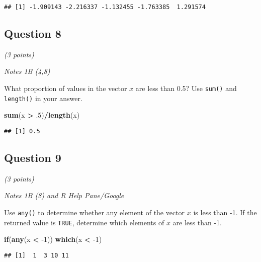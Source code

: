 \documentclass[
]{article}
\newenvironment{Shaded}{\begin{snugshade}}{\end{snugshade}}
\newcommand{\ControlFlowTok}[1]{\textcolor[rgb]{0.13,0.29,0.53}{\textbf{#1}}}
\newcommand{\DecValTok}[1]{\textcolor[rgb]{0.00,0.00,0.81}{#1}}
\newcommand{\FloatTok}[1]{\textcolor[rgb]{0.00,0.00,0.81}{#1}}
\newcommand{\KeywordTok}[1]{\textcolor[rgb]{0.13,0.29,0.53}{\textbf{#1}}}
\newcommand{\NormalTok}[1]{#1}
\newcommand{\OperatorTok}[1]{\textcolor[rgb]{0.81,0.36,0.00}{\textbf{#1}}}
\newcommand{\StringTok}[1]{\textcolor[rgb]{0.31,0.60,0.02}{#1}}
\begin{document}
\begin{verbatim}
## [1] -1.909143 -2.216337 -1.132455 -1.763385  1.291574
\end{verbatim}

\hypertarget{question-8}{%
\subsection{Question 8}\label{question-8}}

\emph{(3 points)}

\emph{Notes 1B (4,8)}

What proportion of values in the vector \(x\) are less than 0.5? Use
\texttt{sum()} and \texttt{length()} in your answer.

\begin{Shaded}
\begin{Highlighting}[]
\KeywordTok{sum}\NormalTok{(x }\OperatorTok{>}\StringTok{ }\FloatTok{.5}\NormalTok{)}\OperatorTok{/}\KeywordTok{length}\NormalTok{(x)}
\end{Highlighting}
\end{Shaded}

\begin{verbatim}
## [1] 0.5
\end{verbatim}

\hypertarget{question-9}{%
\subsection{Question 9}\label{question-9}}

\emph{(3 points)}

\emph{Notes 1B (8) and R Help Pane/Google}

Use \texttt{any()} to determine whether any element of the vector \(x\)
is less than -1. If the returned value is \texttt{TRUE}, determine which
elements of \(x\) are less than -1.

\begin{Shaded}
\begin{Highlighting}[]
\ControlFlowTok{if}\NormalTok{(}\KeywordTok{any}\NormalTok{(x }\OperatorTok{<}\StringTok{ }\DecValTok{-1}\NormalTok{)) }\KeywordTok{which}\NormalTok{(x }\OperatorTok{<}\StringTok{ }\DecValTok{-1}\NormalTok{)}
\end{Highlighting}
\end{Shaded}

\begin{verbatim}
## [1]  1  3 10 11
\end{verbatim}
\end{document}
